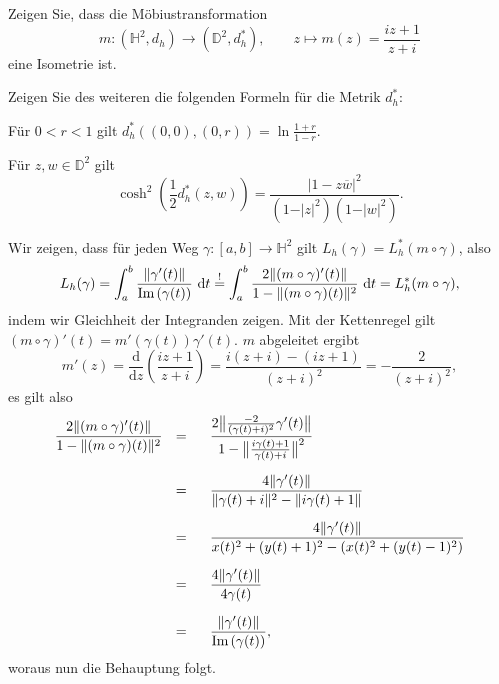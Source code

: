 \documentclass[11pt]{book}
\numberwithin{dummy}{section}
\theoremstyle{nonumberbreak}
\newenvironment{prob}[1][]{\ifthenelse{\equal{#1}{}}{\problem}{\problem[#1]}\rm}{\endproblem}
\newenvironment{sol}[1][]{\ifthenelse{\equal{#1}{}}{\solution}{\solution[#1]}\rm}{\endsolution}
\newcommand{\Imm}{\mathrm{Im}\hspace{1.5pt}}
\newcommand{\He}{\mathbb{H}}
\newcommand{\D}{\mathbb{D}}
\newcommand{\la}{\longrightarrow}
\begin{document}
\begin{spacing}{1.4}
\begin{prob}   %
\begin{compactenum}
\item Zeigen Sie, dass die Möbiustransformation 
$$m: (\He^2, d_h) \la (\D^2, d_h^*), \qquad z \mapsto m(z)=\frac{iz+1}{z+i}$$
eine Isometrie ist.
\item Zeigen Sie des weiteren die folgenden Formeln für die Metrik $d_h^*$:
\begin{compactenum}
\item Für $0<r<1$ gilt $d_h^*((0,0),(0,r)) = \ln \frac{1+r}{1-r}$.
\item Für $z,w \in \D^2$ gilt 
$$\cosh^2 \left( \frac{1}{2} d_h^*(z,w)\right) = \frac{\vert 1 - z \overline{w}\vert^2}{(1-\vert z \vert^2)(1-\vert w \vert ^2)}.$$
\end{compactenum}

\end{compactenum}

\begin{sol}
\begin{compactenum}
\item Wir zeigen, dass für jeden Weg $\gamma:[a,b] \la \He^2$ gilt $L_h(\gamma)=L_h^*(m\circ\gamma)$, also 
$$L_h(\gamma)= \int_a^b \frac{\Vert \gamma'(t)\Vert}{\Imm (\gamma(t))} \ \mathrm{d}t \overset{!}{=} \int_a^b \frac{2 \Vert (m\circ \gamma)'(t)\Vert}{1-\Vert (m\circ \gamma)(t)\Vert^2}\ \mathrm{d}t = L_h^*(m \circ \gamma),$$
indem wir Gleichheit der Integranden zeigen. Mit der Kettenregel gilt $(m \circ \gamma)'(t)= m'(\gamma(t))\gamma'(t)$. $m$ abgeleitet ergibt
$$m'(z) = \frac{\mathrm{d}}{\mathrm{d}z} \left( \frac{iz+1}{z+i}\right) = \frac{i(z+i)-(iz+1)}{(z+i)^2} = -\frac{2}{(z+i)^2},$$
es gilt also
\begin{alignat*}{5}
\frac{2 \Vert (m\circ \gamma)'(t)\Vert}{1-\Vert (m\circ \gamma)(t)\Vert^2} \ \ &=&& \ \  \frac{2 \big\Vert \frac{-2}{(\gamma(t)+i)^2} \gamma'(t) \big\Vert}{1-\big\Vert \frac{i\gamma(t) + 1}{\gamma(t)+i}\big\Vert^2}\\[6pt]
&=&& \ \ \frac{4 \Vert \gamma'(t)\Vert}{\Vert \gamma(t)+i\Vert^2 -\Vert i \gamma(t) + 1 \Vert} \\[6pt]
&=&& \ \ \frac{4 \Vert \gamma'(t)\Vert}{x(t)^2 + (y(t)+1)^2 - (x(t)^2 + (y(t)-1)^2)} \\[6pt]
&=&& \ \ \frac{4 \Vert \gamma'(t)\Vert}{4 \gamma(t)} \\[6pt]
&=&& \ \ \frac{\Vert \gamma'(t)\Vert}{\Imm(\gamma(t))},
\end{alignat*}
woraus nun die Behauptung folgt.


\end{compactenum}
\end{sol}
\end{prob}
\end{spacing}
\end{document}
